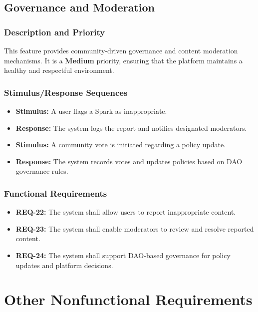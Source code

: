 \documentclass[a4paper,12pt]{article}
\begin{document}
\subsection{Governance and Moderation}
\subsubsection{Description and Priority}
This feature provides community-driven governance and content moderation mechanisms. It is a \textbf{Medium} priority, ensuring that the platform maintains a healthy and respectful environment.

\subsubsection{Stimulus/Response Sequences}
\begin{itemize}
    \item \textbf{Stimulus:} A user flags a Spark as inappropriate.
    \item \textbf{Response:} The system logs the report and notifies designated moderators.
    \item \textbf{Stimulus:} A community vote is initiated regarding a policy update.
    \item \textbf{Response:} The system records votes and updates policies based on DAO governance rules.
\end{itemize}

\subsubsection{Functional Requirements}
\begin{itemize}
    \item \textbf{REQ-22:} The system shall allow users to report inappropriate content.
    \item \textbf{REQ-23:} The system shall enable moderators to review and resolve reported content.
    \item \textbf{REQ-24:} The system shall support DAO-based governance for policy updates and platform decisions.
\end{itemize}

\section{Other Nonfunctional Requirements}
\end{document}
